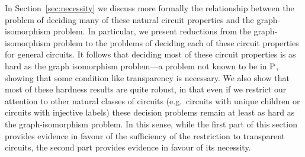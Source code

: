 \documentclass[../paper.tex]{subfiles}
\begin{document}
In Section~\ref{sec:necessity} we discuss more formally the relationship between
the problem of deciding many of these natural circuit properties and the
graph-isomorphism problem. In particular, we present reductions from the
graph-isomorphism problem to the problems of deciding each of these circuit
properties for general circuits. It follows that deciding most of these circuit
properties is as hard as the graph isomorphism problem---a problem not known to
be in $\mathrm{P}$, showing that some condition like transparency is necessary. We also
show that most of these hardness results are quite robust, in that even if we
restrict our attention to other natural classes of circuits (e.g.\ circuits with
unique children or circuits with injective labels) these decision problems
remain at least as hard as the graph-isomorphism problem. In this sense, while
the first part of this section provides evidence in favour of the sufficiency of
the restriction to transparent circuits, the second part provides evidence in
favour of its necessity.










\end{document}

